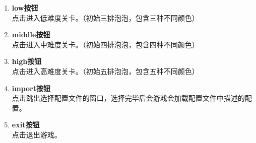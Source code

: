\documentclass{article}
\begin{document}
        \begin{enumerate}
            \item \textbf{low按钮}\\
            点击进入低难度关卡。（初始三排泡泡，包含三种不同颜色）
            \item \textbf{middle按钮}\\
            点击进入中难度关卡。（初始四排泡泡，包含四种不同颜色）
            \item \textbf{high按钮}\\
            点击进入高难度关卡。（初始五排泡泡，包含五种不同颜色）
            \item \textbf{import按钮}\\
            点击跳出选择配置文件的窗口，选择完毕后会游戏会加载配置文件中描述的配置。
            \item \textbf{exit按钮}\\
            点击退出游戏。
        \end{enumerate}
\end{document}
